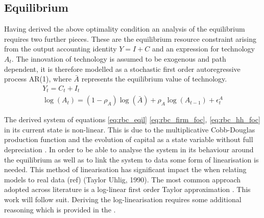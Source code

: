 \documentclass[12pt,a4paper,english]{article} %
\begin{document}
	\subsection{Equilibrium}
	Having derived the above optimality condition an analysis of the equilibrium requires two further pieces. These are the equilibrium resource constraint arising from the output accounting identity $Y = I + C$ and an expression for technology $A_t$. The innovation of technology is assumed to be exogenous and path dependent, it is therefore modelled as a stochastic first order autoregressive process AR(1), where $\bar{A}$ represents the equilibrium value of technology.
	\begin{equation} \label{eq:rbc_eqil}
		\begin{aligned}
			Y_t = C_t + I_t \\
			\log(A_t) = (1- \rho_A) \log(\bar{A}) + \rho_A \log(A_{t-1}) + \epsilon_t^A
		\end{aligned}
	\end{equation}

	The derived system of equations \eqref{eq:rbc_eqil} \eqref{eq:rbc_firm_foc}, \eqref{eq:rbc_hh_foc} in its current state is non-linear. This is due to the multiplicative Cobb-Douglas production function and the evolution of capital as a state variable without full depreciation \cite{campbell_inspecting_1994}. In order to be able to analyse the system in its behaviour around the equilibrium as well as to link the system to data some form of linearisation is needed. This method of linearisation has significant impact the when relating models to real data (ref) (Taylor  Uhlig, 1990). The most common approach adopted across literature is a log-linear first order Taylor approximation \cite{campbell_inspecting_1994}. This work will follow suit.
	Deriving the log-linearisation requires some additional reasoning which is provided in the .
	
\end{document}
